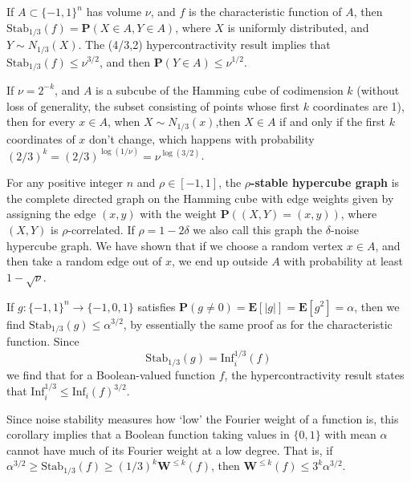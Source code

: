 \begin{corollary}
    If $A \subset \{ -1, 1 \}^n$ has volume $\nu$, and $f$ is the characteristic function of $A$, then $\text{Stab}_{1/3}(f) = \mathbf{P}(X \in A, Y \in A)$, where $X$ is uniformly distributed, and $Y \sim N_{1/3}(X)$. The (4/3,2) hypercontractivity result implies that $\text{Stab}_{1/3}(f) \leq \nu^{3/2}$, and then $\mathbf{P}(Y \in A) \leq \nu^{1/2}$.
\end{corollary}

\begin{example}
    If $\nu = 2^{-k}$, and $A$ is a subcube of the Hamming cube of codimension $k$ (without loss of generality, the subset consisting of points whose first $k$ coordinates are 1), then for every $x \in A$, when $X \sim N_{1/3}(x)$,then $X \in A$ if and only if the first $k$ coordinates of $x$ don't change, which happens with probability $(2/3)^k = (2/3)^{\log(1/\nu)} = \nu^{\log(3/2)}$.
\end{example}

\begin{example}
    For any positive integer $n$ and $\rho \in [-1,1]$, the {\bf $\rho$-stable hypercube graph} is the complete directed graph on the Hamming cube with edge weights given by assigning the edge $(x,y)$ with the weight $\mathbf{P}((X,Y) = (x,y))$, where $(X,Y)$ is $\rho$-correlated. If $\rho = 1 - 2\delta$ we also call this graph the $\delta$-noise hypercube graph. We have shown that if we choose a random vertex $x \in A$, and then take a random edge out of $x$, we end up outside $A$ with probability at least $1 - \sqrt{\nu}$.
\end{example}

If $g: \{ -1, 1 \}^n \to \{ -1, 0 ,1 \}$ satisfies $\mathbf{P}(g \neq 0) = \mathbf{E}[|g|] = \mathbf{E}[g^2] = \alpha$, then we find $\text{Stab}_{1/3}(g) \leq \alpha^{3/2}$, by essentially the same proof as for the characteristic function. Since
%
\[ \text{Stab}_{1/3}(g) = \text{Inf}_i^{1/3}(f) \]
%
we find that for a Boolean-valued function $f$, the hypercontractivity result states that $\text{Inf}_i^{1/3} \leq \text{Inf}_i(f)^{3/2}$.

Since noise stability measures how `low' the Fourier weight of a function is, this corollary implies that a Boolean function taking values in $\{ 0, 1 \}$ with mean $\alpha$ cannot have much of its Fourier weight at a low degree. That is, if $\alpha^{3/2} \geq \text{Stab}_{1/3}(f) \geq (1/3)^k \mathbf{W}^{\leq k}(f)$, then $\mathbf{W}^{\leq k}(f) \leq 3^k \alpha^{3/2}$.

